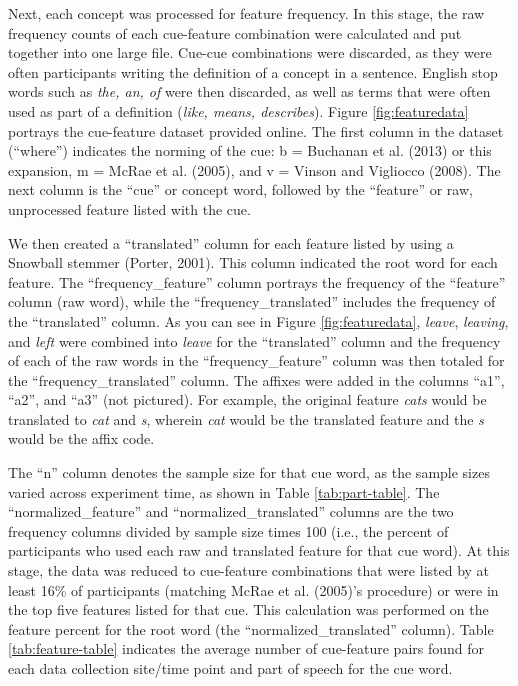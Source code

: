 \documentclass[english,,man]{apa6}
\begin{document}
Next, each concept was processed for feature frequency. In this stage, the raw frequency counts of each cue-feature combination were calculated and put together into one large file. Cue-cue combinations were discarded, as they were often participants writing the definition of a concept in a sentence. English stop words such as \emph{the, an, of} were then discarded, as well as terms that were often used as part of a definition (\emph{like, means, describes}). Figure \ref{fig:featuredata} portrays the cue-feature dataset provided online. The first column in the dataset (\enquote{where}) indicates the norming of the cue: b = Buchanan et al. (2013) or this expansion, m = McRae et al. (2005), and v = Vinson and Vigliocco (2008). The next column is the \enquote{cue} or concept word, followed by the \enquote{feature} or raw, unprocessed feature listed with the cue.

We then created a \enquote{translated} column for each feature listed by using a Snowball stemmer (Porter, 2001). This column indicated the root word for each feature. The \enquote{frequency\_feature} column portrays the frequency of the \enquote{feature} column (raw word), while the \enquote{frequency\_translated} includes the frequency of the \enquote{translated} column. As you can see in Figure \ref{fig:featuredata}, \emph{leave}, \emph{leaving}, and \emph{left} were combined into \emph{leave} for the \enquote{translated} column and the frequency of each of the raw words in the \enquote{frequency\_feature} column was then totaled for the \enquote{frequency\_translated} column. The affixes were added in the columns \enquote{a1}, \enquote{a2}, and \enquote{a3} (not pictured). For example, the original feature \emph{cats} would be translated to \emph{cat} and \emph{s}, wherein \emph{cat} would be the translated feature and the \emph{s} would be the affix code.

The \enquote{n} column denotes the sample size for that cue word, as the sample sizes varied across experiment time, as shown in Table \ref{tab:part-table}. The \enquote{normalized\_feature} and \enquote{normalized\_translated} columns are the two frequency columns divided by sample size times 100 (i.e., the percent of participants who used each raw and translated feature for that cue word). At this stage, the data was reduced to cue-feature combinations that were listed by at least 16\% of participants (matching McRae et al. (2005)'s procedure) or were in the top five features listed for that cue. This calculation was performed on the feature percent for the root word (the \enquote{normalized\_translated} column). Table \ref{tab:feature-table} indicates the average number of cue-feature pairs found for each data collection site/time point and part of speech for the cue word.
\end{document}
